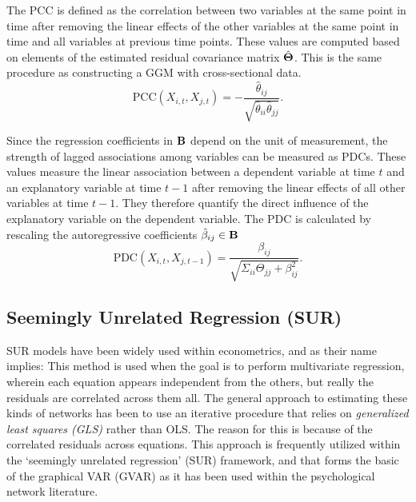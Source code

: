 The PCC is defined as the correlation between two variables at the same point in time after removing the linear effects of the other variables at the same point in time and all variables at previous time points. These values are computed based on elements of the estimated residual covariance matrix $\hat{\mathbf{\Theta}}$. This is the same procedure as constructing a GGM with cross-sectional data.
\begin{equation}
    \text{PCC}(X_{i,t}, X_{j,t}) = - \frac{\hat{\theta}_{ij}}{\sqrt{\hat{\theta}_{ii} \hat{\theta}_{jj}}}.
\end{equation}

Since the regression coefficients in $\mathbf{B}$ depend on the unit of measurement, the strength of lagged associations among variables can be measured as PDCs. These values measure the linear association between a dependent variable at time $t$ and an explanatory variable at time $t - 1$ after removing the linear effects of all other variables at time $t-1$. They therefore quantify the direct influence of the explanatory variable on the dependent variable. The PDC is calculated by rescaling the autoregressive coefficients $\hat{\beta}_{ij} \in \mathbf{B}$
\begin{equation}
    \text{PDC}(X_{i,t}, X_{j, t-1}) = \frac{\beta_{ij}}{\sqrt{\Sigma_{ii} \Theta_{jj} + \beta_{ij}^2}}.
\end{equation}

\subsection{Seemingly Unrelated Regression (SUR)}
SUR models have been widely used within econometrics, and as their name implies: This method is used when the goal is to perform multivariate regression, wherein each equation appears independent from the others, but really the residuals are correlated across them all. The general approach to estimating these kinds of networks has been to use an iterative procedure that relies on \textit{generalized least squares (GLS)} rather than OLS. The reason for this is because of the correlated residuals across equations. This approach is frequently utilized within the `seemingly unrelated regression' (SUR) framework, and that forms the basic of the graphical VAR (GVAR) as it has been used within the psychological network literature.


